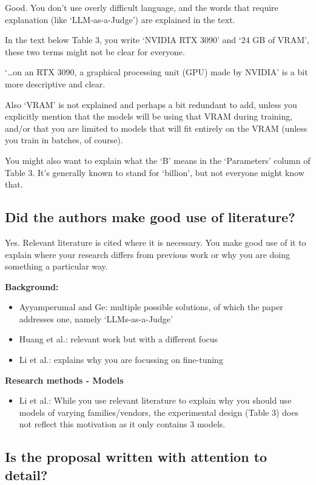 \documentclass{article}
\begin{document}
Good. You don't use overly difficult language, and the words that require explanation (like `LLM-as-a-Judge') are explained in the text.

In the text below Table 3, you write `NVIDIA RTX 3090' and `24 GB of VRAM', these two terms might not be clear for everyone.

`\ldots on an RTX 3090, a graphical processing unit (GPU) made by NVIDIA' is a bit more descriptive and clear.

Also `VRAM' is not explained and perhaps a bit redundant to add, unless you explicitly mention that the models will be using that VRAM during training, and/or that you are limited to models that will fit entirely on the VRAM (unless you train in batches, of course).

You might also want to explain what the `B' means in the `Parameters' column of Table 3. It's generally known to stand for `billion', but not everyone might know that.


\subsection{Did the authors make good use of literature?}

Yes. Relevant literature is cited where it is necessary. You make good use of it to explain where your research differs from previous work or why you are doing something a particular way.


\textbf{Background:}

\begin{itemize}
	\item Ayyamperumal and Ge: multiple possible solutions, of which the paper addresses one, namely `LLMs-as-a-Judge'
	\item Huang et al.: relevant work but with a different focus
	\item Li et al.: explains why you are focussing on fine-tuning
\end{itemize}

\textbf{Research methods - Models}
\begin{itemize}
	\item Li et al.: While you use relevant literature to explain why you should use models of varying families/vendors, the experimental design (Table 3) does not reflect this motivation as it only contains 3 models.
\end{itemize}

\subsection{Is the proposal written with attention to detail?}
\end{document}
